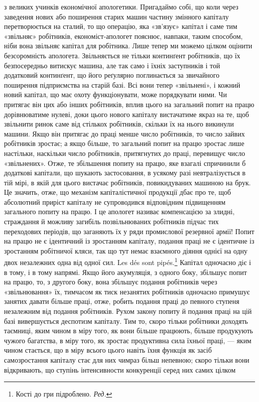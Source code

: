 \parcont{}  %
з великих учинків економічної апологетики. Пригадаймо собі,
що коли через заведення нових або поширення старих машин
частину змінного капіталу перетворюється на сталий, то що
операцію, яка «зв’язує» капітал і саме тим «звільняє» робітників,
економіст-апологет пояснює, навпаки, таким способом,
ніби вона звільняє капітал для робітника. Лише тепер ми можемо
цілком оцінити безсоромність апологета. Звільняється не тільки
континґент робітників, що їх безпосередньо витискує машина,
але так само і їхніх заступників і той додатковий континґент,
що його реґулярно поглинається за звичайного поширення підприємства
на старій базі. Всі вони тепер «звільнені», і кожний
новий капітал, що має охоту функціонувати, може порядкувати
ними. Чи притягає він цих або інших робітників, вплив цього
на загальний попит на працю дорівнюватиме нулеві, доки цього
нового капіталу вистачатиме якраз на те, щоб звільнити ринок
саме від стількох робітників, скільки їх на нього викинули машини.
Якщо він притягає до праці менше число робітників, то
число зайвих робітників зростає; а якщо більше, то загальний
попит на працю зростає лише настільки, наскільки число робітників,
притягнутих до праці, перевищує число «звільнених».
Отже, те збільшення попиту на працю, яке взагалі спричинили б
додаткові капітали, що шукають застосовання, в усякому разі
невтралізується в тій мірі, в якій для цього вистачає робітників,
повикидуваних машиною на брук. Це значить, отже, що механізм
капіталістичної продукції дбає про те, щоб абсолютний приріст
капіталу не супроводився відповідним підвищенням загального
попиту на працю. І це апологет називає компенсацією за злидні,
страждання й можливу загибіль позвільнюваних робітників підчас
тих переходових періодів, що заганяють їх у ряди промислової
резервної армії! Попит на працю не є ідентичний із зростанням
капіталу, подання праці не є ідентичне із зростанням робітничої
кляси, так що тут немає взаємного діяння однієї на одну двох
незалежних одна від одної сил. Les dés sont pipés.\footnote*{
Кості до гри підроблено. \emph{Ред.}
} Капітал
одночасно діє і в тому, і в тому напрямі. Якщо його акумуляція,
з одного боку, збільшує попит на працю, то, з другого боку,
вона збільшує подання робітників через «звільнювання» їх,
тимчасом як тиск незанятих робітників одночасно примушує
занятих давати більше праці, отже, робить подання праці до
певного ступеня незалежним від подання робітників. Рухом закону
попиту й подання праці на цій базі вивершується деспотизм
капіталу. Тим то, скоро тільки робітники доходять таємниці,
яким чином в міру того, як вони більше працюють, більше продукують
чужого багатства, в міру того, як зростає продуктивна
сила їхньої праці, — яким чином стається, що в міру всього цього
навіть їхня функція як засіб самозростання капіталу стає для
них чимраз більш непевною; скоро тільки вони відкривають,
що ступінь інтенсивности конкуренції серед них самих цілком
\parbreak{}  %
